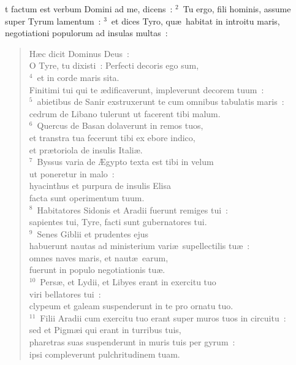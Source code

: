 \bchapter
{}t factum est verbum Domini ad me, dicens~:
${}^{2}$~Tu ergo, fili hominis, assume super Tyrum lamentum~:
${}^{3}$~et dices Tyro, qu\ae\ habitat in introitu maris, negotiationi populorum ad insulas multas~: \begin{flushleft}\begin{verse}H\ae c dicit Dominus Deus~:\\ O Tyre, tu dixisti~: Perfecti decoris ego sum,\\
${}^{4}$~et in corde maris sita.\\ Finitimi tui qui te \ae dificaverunt, impleverunt decorem tuum~:\\
${}^{5}$~abietibus de Sanir exstruxerunt te cum omnibus tabulatis maris~:\\ cedrum de Libano tulerunt ut facerent tibi malum.\\
${}^{6}$~Quercus de Basan dolaverunt in remos tuos,\\ et transtra tua fecerunt tibi ex ebore indico,\\ et pr\ae toriola de insulis Itali\ae .\\
${}^{7}$~Byssus varia de \AE gypto texta est tibi in velum\\ ut poneretur in malo~:\\ hyacinthus et purpura de insulis Elisa\\ facta sunt operimentum tuum.\\
${}^{8}$~Habitatores Sidonis et Aradii fuerunt remiges tui~:\\ sapientes tui, Tyre, facti sunt gubernatores tui.\\
${}^{9}$~Senes Giblii et prudentes ejus\\ habuerunt nautas ad ministerium vari\ae\ supellectilis tu\ae~:\\ omnes naves maris, et naut\ae\ earum,\\ fuerunt in populo negotiationis tu\ae .\\
${}^{10}$~Pers\ae , et Lydii, et Libyes erant in exercitu tuo\\ viri bellatores tui~:\\ clypeum et galeam suspenderunt in te pro ornatu tuo.\\
${}^{11}$~Filii Aradii cum exercitu tuo erant super muros tuos in circuitu~:\\ sed et Pigm\ae i qui erant in turribus tuis,\\ pharetras suas suspenderunt in muris tuis per gyrum~:\\ ipsi compleverunt pulchritudinem tuam.\\

\end{verse}
\end{flushleft}
